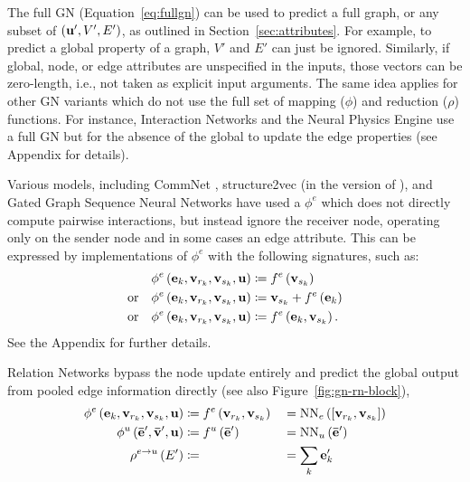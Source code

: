 The full GN (Equation~\ref{eq:fullgn}) can be used to predict a full graph, or any subset of $\left(\mathbf{u}', V', E'\right)$, as outlined in Section~\ref{sec:attributes}. For example, to predict a global property of a graph, $V'$ and $E'$ can just be ignored. Similarly, if global, node, or edge attributes are unspecified in the inputs, those vectors can be zero-length, i.e., not taken as explicit input arguments. The same idea applies for other GN variants which do not use the full set of mapping ($\phi$) and reduction ($\rho$) functions. For instance, Interaction Networks \citep{battaglia2016interaction,watters2017visual} and the Neural Physics Engine \citep{chang2016compositional} use a full GN but for the absence of the global to update the edge properties (see Appendix for details).

Various models, including CommNet \citep{sukhbaatar2016learning}, structure2vec \citep{dai2016} (in the version of \citep{dai2017learning}), and Gated Graph Sequence Neural Networks \citep{li2015gated} have used a $\phi^e$ which does not directly compute pairwise interactions, but instead ignore the receiver node, operating only on the sender node and in some cases an edge attribute. This can be expressed by implementations of $\phi^e$ with the following signatures, such as:
\begin{equation*}
\begin{split}
 &\phi^e\left(\mathbf{e}_k, \mathbf{v}_{r_k}, \mathbf{v}_{s_k}, \mathbf{u}\right) \coloneqq f^e\left(\mathbf{v}_{s_k}\right)\\ \mathrm{  or  }\quad   &\phi^e\left(\mathbf{e}_k, \mathbf{v}_{r_k}, \mathbf{v}_{s_k}, \mathbf{u}\right) \coloneqq \mathbf{v}_{s_k} + f^e\left(\mathbf{e}_k\right)\\ \mathrm{  or  }\quad
&\phi^e\left(\mathbf{e}_k, \mathbf{v}_{r_k}, \mathbf{v}_{s_k}, \mathbf{u}\right) \coloneqq f^e\left(\mathbf{e}_k, \mathbf{v}_{s_k}\right).
\end{split}
\end{equation*}
See the Appendix for further details.

Relation Networks \citep{raposo2017discovering,santoro2017simple} bypass the node update entirely and predict the global output from pooled edge information directly (see also Figure~\ref{fig:gn-rn-block}),
\begin{alignat*}{4}
\phi^e\left(\mathbf{e}_k, \mathbf{v}_{r_k}, \mathbf{v}_{s_k}, \mathbf{u}\right) &\coloneqq f^e\left(\mathbf{v}_{r_k}, \mathbf{v}_{s_k}\right) &&= \mathrm{NN}_{e}\left([\mathbf{v}_{r_k}, \mathbf{v}_{s_k}]\right) \\
\phi^u\left(\mathbf{\bar{e}}', \mathbf{\bar{v}}', \mathbf{u}\right) &\coloneqq f^u\left(\mathbf{\bar{e}}'\right) &&= \mathrm{NN}_{u}\left(\mathbf{\bar{e}}'\right)\\
\rho^{e\rightarrow u}\left(E'\right) &\coloneqq \; &&= \sum_k \mathbf{e}'_k
\end{alignat*}


